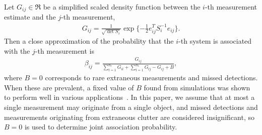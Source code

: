 Let $G_{ij}\in\Re$ be a simplified scaled density function between the $i$-th measurement estimate and the $j$-th measurement,
\begin{align}
G_{ij}=\frac1{\sqrt{\det{S_{i}}}}\exp{\{-\frac12e_{ij}^TS_{i}^{-1}e_{ij}\}}.
\end{align}
Then a close approximation of the probability that the $i$-th system is associated with the $j$-th measurement is
\begin{align}
\label{eqn:betaDef}
\beta_{ij}=\frac{G_{ij}}{\sum\limits_{l=1}^{n_r}G_{il}+\sum\limits_{l=1}^{n_t}G_{lj}-G_{ij}+B},
\end{align}
where $B=0$ corresponds to rare extraneous measurements and missed detections. When these are prevalent, a fixed value of $B$ found from simulations was shown to perform well in various applications~\cite{Bar1990}. In this paper, we assume that at most a single measurement may originate from a single object, and missed detections and measurements originating from extraneous clutter are considered insignificant, so $B=0$ is used to determine joint association probability.









